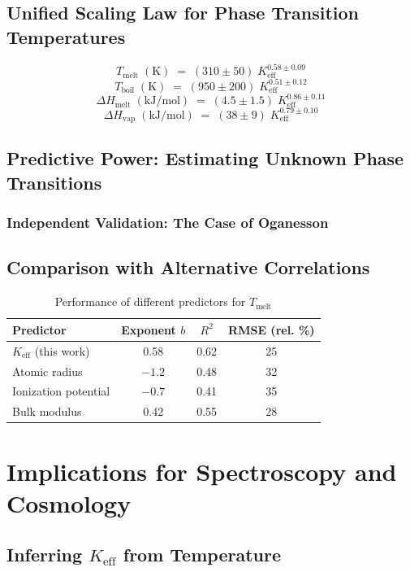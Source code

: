 \documentclass[12pt,a4paper]{article}
\newcommand{\Keff}{K_{\mathrm{eff}}}
\begin{document}
	\subsection{Unified Scaling Law for Phase Transition Temperatures}
	\[
	\boxed{T_{\text{melt}} \;(\mathrm{K}) \;=\; (310 \pm 50) \; \Keff^{0.58 \pm 0.09}}
	\]
	\[
	\boxed{T_{\text{boil}} \;(\mathrm{K}) \;=\; (950 \pm 200) \; \Keff^{0.51 \pm 0.12}}
	\]
	\[
	\boxed{\Delta H_{\text{melt}} \;(\mathrm{kJ/mol}) \;=\; (4.5 \pm 1.5) \; \Keff^{0.86 \pm 0.11}}
	\]
	\[
	\boxed{\Delta H_{\text{vap}} \;(\mathrm{kJ/mol}) \;=\; (38 \pm 9) \; \Keff^{0.79 \pm 0.10}}
	\]
	
	\subsection{Predictive Power: Estimating Unknown Phase Transitions}
	\subsubsection{Independent Validation: The Case of Oganesson}
	\subsection{Comparison with Alternative Correlations}
	
	\begin{table}[htbp]
		\centering
		\caption{Performance of different predictors for \(T_{\text{melt}}\)}
		\label{tab:comparison}
		\begin{tabular}{@{}lccc@{}}
			\toprule
			\textbf{Predictor} & \textbf{Exponent }\(b\) & \textbf{\(R^2\)} & \textbf{RMSE (rel. \%)} \\
			\midrule
			\(K_{\mathrm{eff}}\) (this work) & 0.58 & 0.62 & 25 \\
			Atomic radius & \(-1.2\) & 0.48 & 32 \\
			Ionization potential & \(-0.7\) & 0.41 & 35 \\
			Bulk modulus & 0.42 & 0.55 & 28 \\
			\bottomrule
		\end{tabular}
	\end{table}
	
	\section{Implications for Spectroscopy and Cosmology}
	\subsection{Inferring \(\Keff\) from Temperature}
\end{document}
